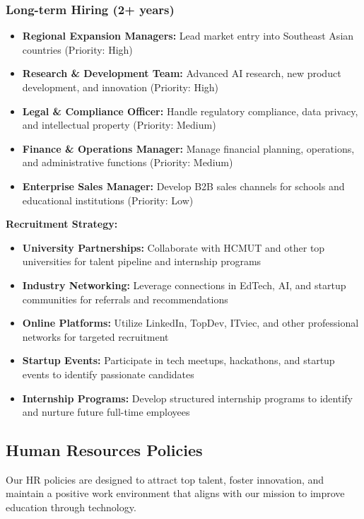 \subsubsection{Long-term Hiring (2+ years)}
\begin{itemize}
    \item \textbf{Regional Expansion Managers:} Lead market entry into Southeast Asian countries (Priority: High)
    \item \textbf{Research \& Development Team:} Advanced AI research, new product development, and innovation (Priority: High)
    \item \textbf{Legal \& Compliance Officer:} Handle regulatory compliance, data privacy, and intellectual property (Priority: Medium)
    \item \textbf{Finance \& Operations Manager:} Manage financial planning, operations, and administrative functions (Priority: Medium)
    \item \textbf{Enterprise Sales Manager:} Develop B2B sales channels for schools and educational institutions (Priority: Low)
\end{itemize}

\textbf{Recruitment Strategy:}
\begin{itemize}
    \item \textbf{University Partnerships:} Collaborate with HCMUT and other top universities for talent pipeline and internship programs
    \item \textbf{Industry Networking:} Leverage connections in EdTech, AI, and startup communities for referrals and recommendations
    \item \textbf{Online Platforms:} Utilize LinkedIn, TopDev, ITviec, and other professional networks for targeted recruitment
    \item \textbf{Startup Events:} Participate in tech meetups, hackathons, and startup events to identify passionate candidates
    \item \textbf{Internship Programs:} Develop structured internship programs to identify and nurture future full-time employees
\end{itemize}

\subsection{Human Resources Policies}
Our HR policies are designed to attract top talent, foster innovation, and maintain a positive work environment that aligns with our mission to improve education through technology.

